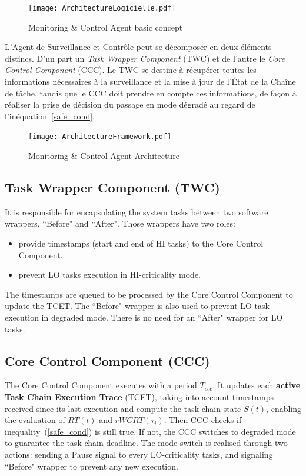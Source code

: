 \documentclass[french, a4paper, 11pt, twoside, pdftex]{StyleThese}
\begin{document}
\begin{figure}[ht]
            \centering
            \texttt{[image: ArchitectureLogicielle.pdf]}
            \caption{Monitoring \& Control Agent basic concept} \label{fig:SoftwareArchitecture}
\end{figure}

	L'Agent de Surveillance et Contrôle peut se décomposer en deux éléments distincs. D'un part un \emph{Task Wrapper Component} (TWC) et de l'autre le \emph{Core Control Component} (CCC). Le TWC se destine à récupérer toutes les informations nécessaires à la surveillance et la mise à jour de l'État de la Chaîne de tâche, tandis que le CCC doit prendre en compte ces informations, de façon à réaliser la prise de décision du passage en mode dégradé au regard de l'inéquation~\ref{safe_cond}.
	
	
        \begin{figure}[ht]
            \centering
            \texttt{[image: ArchitectureFramework.pdf]}
            \caption{Monitoring \& Control Agent Architecture\label{fig:architecture}}
        \end{figure}
        
        
        \subsection{Task Wrapper Component (TWC)} 
        
        It is responsible for encapsulating the system tasks between two software wrappers, ``Before" and ``After". Those wrappers have two roles: \begin{itemize}
                \item provide timestamps (start and end of HI tasks) to the Core Control Component.
                \item prevent LO tasks execution in HI-criticality mode.
            \end{itemize}
            

        The timestamps are queued to be processed by the Core Control Component to update the TCET.
        The ``Before" wrapper is also used to prevent LO task execution in degraded mode. There is no need for an ``After" wrapper for LO tasks.

        \subsection{Core Control Component (CCC)}
           The Core Control Component executes with a period $T_{ccc}$. It updates each \textbf{active Task Chain Execution Trace} (TCET), taking into account timestamps received since its last execution and compute the task chain state $S(t)$, enabling the evaluation of $RT(t)$ and $rWCRT(\tau_i)$. Then CCC checks if inequality~(\ref{safe_cond}) is still true. If not, the CCC switches to degraded mode to guarantee the task chain deadline. The mode switch is realised through two actions: sending a Pause signal to every LO-criticality tasks, and signaling ``Before" wrapper to prevent any new execution.
        
\end{document}
